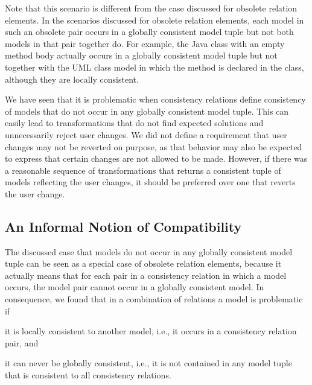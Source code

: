 Note that this scenario is different from the case discussed for obsolete relation elements.
In the scenarios discussed for obsolete relation elements, each model in such an obsolete pair occurs in a globally consistent model tuple but not both models in that pair together do.
For example, the Java class with an empty method body actually occurs in a globally consistent model tuple but not together with the \gls{UML} class model in which the method is declared in the class, although they are locally consistent.

We have seen that it is problematic when consistency relations define consistency of models that do not occur in any globally consistent model tuple.
This can easily lead to transformations that do not find expected solutions and unnecessarily reject user changes.
We did not define a requirement that user changes may not be reverted on purpose, as that behavior may also be expected to express that certain changes are not allowed to be made.
However, if there was a reasonable sequence of transformations that returns a consistent tuple of models reflecting the user changes, it should be preferred over one that reverts the user change.


\subsection{An Informal Notion of Compatibility}

The discussed case that models do not occur in any globally consistent model tuple can be seen as a special case of obsolete relation elements, because it actually means that for each pair in a consistency relation in which a model occurs, the model pair cannot occur in a globally consistent model.
In consequence, we found that in a combination of relations a model is problematic if
\begin{shortenumerate}
    \item it is locally consistent to another model, i.e., it occurs in a consistency relation pair, and
    \item it can never be globally consistent, i.e., it is not contained in any model tuple that is consistent to all consistency relations.
\end{shortenumerate}

